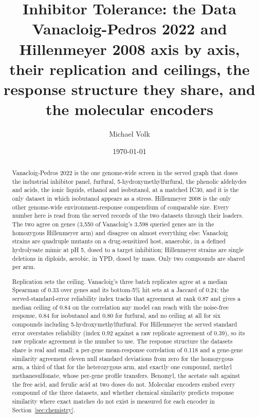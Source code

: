 \documentclass[10pt,a4paper]{article}
\title{\vspace{-1.5em}Inhibitor Tolerance: the Data\\
  {\large Vanacloig-Pedros 2022 and Hillenmeyer 2008 axis by axis, their replication
   and ceilings, the response structure they share, and the molecular encoders}}
\author{Michael Volk}
\date{\today}
\begin{document}
\maketitle
\thispagestyle{empty}

\begin{abstract}
\noindent
Vanacloig-Pedros 2022 is the one genome-wide screen in the served graph that doses the
industrial inhibitor panel, furfural, 5-hydroxymethylfurfural, the phenolic aldehydes
and acids, the ionic liquids, ethanol and isobutanol, at a matched IC30, and it is the
only dataset in which isobutanol appears as a stress. Hillenmeyer 2008 is the only
other genome-wide environment-response compendium of comparable size. Every number here
is read from the served records of the two datasets through their loaders. The two
agree on genes (3{,}550 of Vanacloig's 3{,}598 queried genes are in the homozygous
Hillenmeyer arm) and disagree on almost everything else: Vanacloig strains are
quadruple mutants on a drug-sensitized host, anaerobic, in a defined hydrolysate mimic
at pH 5, dosed to a target inhibition; Hillenmeyer strains are single deletions in
diploids, aerobic, in YPD, dosed by mass. Only two compounds are shared per arm.

Replication sets the ceiling. Vanacloig's three batch replicates agree at a median
Spearman of 0.33 over genes and its bottom-5\% hit sets at a Jaccard of 0.24; the
served-standard-error reliability index tracks that agreement at rank 0.87 and gives a
median ceiling of 0.84 on the correlation any model can reach with the noise-free
response, 0.84 for isobutanol and 0.80 for furfural, and no ceiling at all for six
compounds including 5-hydroxymethylfurfural. For Hillenmeyer the served standard error
overstates reliability (index 0.92 against a raw replicate agreement of 0.39), so its
raw replicate agreement is the number to use. The response structure the datasets
share is real and small: a per-gene mean-response correlation of 0.118 and a gene-gene
similarity agreement eleven null standard deviations from zero for the homozygous arm,
a third of that for the heterozygous arm, and exactly one compound, methyl
methanesulfonate, whose per-gene profile transfers. Benomyl, the acetate salt against
the free acid, and ferulic acid at two doses do not. Molecular encoders embed every
compound of the three datasets, and whether chemical similarity predicts response
similarity where exact matches do not exist is measured for each encoder in
Section~\ref{sec:chemistry}.
\end{abstract}

\vspace{0.5em}
\tccontents
\clearpage








\end{document}

